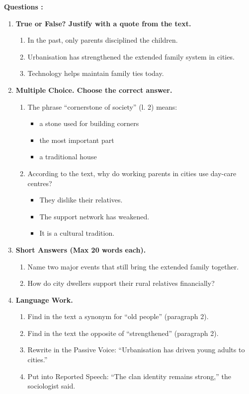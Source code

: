 \documentclass[11pt]{article}
\begin{document}
\begin{exercice}
\textbf{Questions :}
\begin{enumerate}
    \item \textbf{True or False? Justify with a quote from the text.}
    \begin{enumerate}
        \item In the past, only parents disciplined the children.
        \item Urbanisation has strengthened the extended family system in cities.
        \item Technology helps maintain family ties today.
    \end{enumerate}
    \item \textbf{Multiple Choice. Choose the correct answer.}
    \begin{enumerate}
        \item The phrase “cornerstone of society” (l. 2) means:
        \begin{itemize}
            \item[a)] a stone used for building corners
            \item[b)] the most important part
            \item[c)] a traditional house
        \end{itemize}
        \item According to the text, why do working parents in cities use day-care centres?
        \begin{itemize}
            \item[a)] They dislike their relatives.
            \item[b)] The support network has weakened.
            \item[c)] It is a cultural tradition.
        \end{itemize}
    \end{enumerate}
    \item \textbf{Short Answers (Max 20 words each).}
    \begin{enumerate}
        \item Name two major events that still bring the extended family together.
        \item How do city dwellers support their rural relatives financially?
    \end{enumerate}
    \item \textbf{Language Work.}
    \begin{enumerate}
        \item Find in the text a synonym for “old people” (paragraph 2).
        \item Find in the text the opposite of “strengthened” (paragraph 2).
        \item Rewrite in the Passive Voice: “Urbanisation has driven young adults to cities.”
        \item Put into Reported Speech: “The clan identity remains strong,” the sociologist said.
    \end{enumerate}
\end{enumerate}
\end{exercice}
\end{document}
